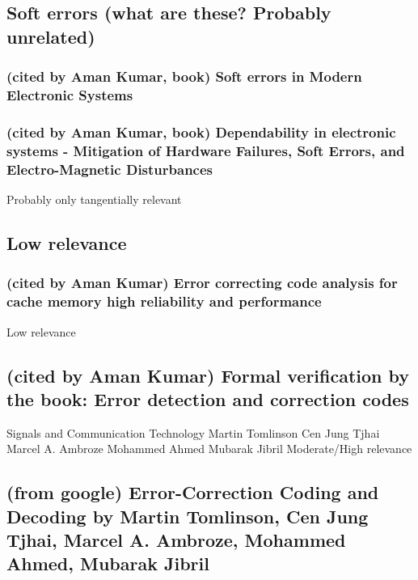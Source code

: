 \documentclass{article}
\begin{document}

\subsection{Soft errors (what are these? Probably unrelated)}

\subsubsection{(cited by Aman Kumar, book) Soft errors in Modern Electronic Systems}

\subsubsection{(cited by Aman Kumar, book) Dependability in electronic systems - Mitigation of Hardware Failures, Soft Errors, and Electro-Magnetic Disturbances}

Probably only tangentially relevant


\subsection{Low relevance}

\subsubsection{(cited by Aman Kumar) Error correcting code analysis for cache memory high reliability and performance}

Low relevance


\subsection{(cited by Aman Kumar) Formal verification by the book: Error detection and correction codes}
Signals and Communication Technology
Martin Tomlinson
Cen Jung Tjhai
Marcel A. Ambroze
Mohammed Ahmed
Mubarak Jibril
Moderate/High relevance

\subsection {(from google) Error-Correction Coding and Decoding by Martin Tomlinson, Cen Jung Tjhai, Marcel A. Ambroze, Mohammed Ahmed, Mubarak Jibril}
\end{document}

